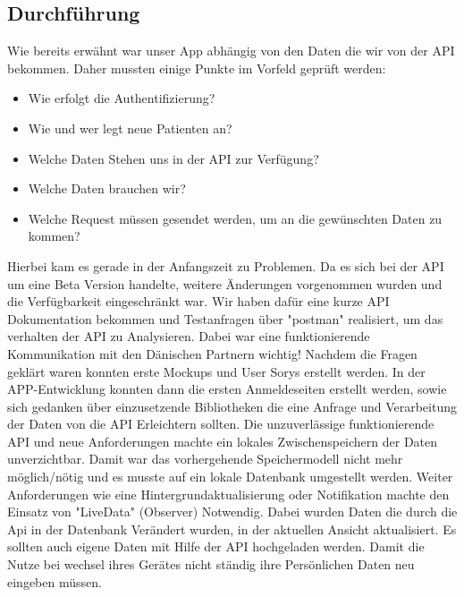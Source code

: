 \subsection{Durchführung}
Wie bereits erwähnt war unser App abhängig von den Daten die wir von der API bekommen. Daher mussten einige Punkte im Vorfeld geprüft werden:
\begin{itemize}\label{stichpunkte}
	\item Wie erfolgt die Authentifizierung?
	\item Wie und wer legt neue Patienten an?
	\item Welche Daten Stehen uns in der API zur Verfügung?
	\item Welche Daten brauchen wir?
	\item Welche Request müssen gesendet werden, um an die gewünschten Daten zu kommen?
\end{itemize}
Hierbei kam es gerade in der Anfangszeit zu Problemen. Da es sich bei der API um eine Beta Version handelte, weitere Änderungen vorgenommen wurden und die Verfügbarkeit eingeschränkt war.
Wir haben dafür eine kurze API Dokumentation bekommen und Testanfragen über "\gls{postman}" realisiert, um das verhalten der API zu Analysieren. Dabei war eine funktionierende Kommunikation mit den Dänischen Partnern wichtig! 
Nachdem die Fragen geklärt waren konnten erste Mockups und User Sorys erstellt werden. In der APP-Entwicklung konnten dann die ersten Anmeldeseiten erstellt werden, sowie sich gedanken   über einzusetzende Bibliotheken die eine Anfrage und Verarbeitung der Daten von die API Erleichtern sollten.
Die unzuverlässige funktionierende API und neue Anforderungen machte ein lokales Zwischenspeichern der Daten unverzichtbar. 
Damit war das vorhergehende Speichermodell nicht mehr möglich/nötig und es musste auf ein lokale Datenbank umgestellt werden. Weiter Anforderungen wie eine Hintergrundaktualisierung oder Notifikation machte den Einsatz von "LiveData"  (Observer) Notwendig. Dabei wurden  Daten die durch die Api in der Datenbank Verändert wurden,  in der aktuellen Ansicht aktualisiert. Es sollten auch eigene Daten mit Hilfe der API hochgeladen werden. Damit die Nutze bei wechsel ihres Gerätes nicht ständig ihre Persönlichen Daten neu eingeben müssen.

